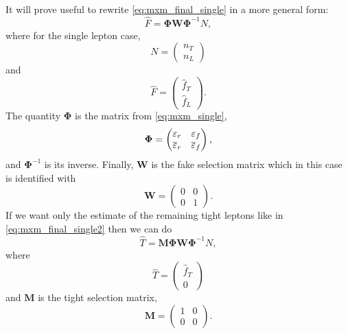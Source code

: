It will prove useful to rewrite \eqn\eqref{eq:mxm_final_single}
in a more general form:
\begin{equation}
\label{eq:mxm_general}
\hat{F} = \mathbf{\Phi}\mathbf{W}\mathbf{\Phi}^{-1} N,
\end{equation}
where for the single lepton case,
\begin{equation}
N=\begin{pmatrix} n_T \\ n_L\end{pmatrix}
\end{equation}
and 
\begin{equation}
\hat{F}=\begin{pmatrix} \hat{f}_T \\ \hat{f}_L\end{pmatrix}.
\end{equation}
The quantity $\mathbf{\Phi}$ is the matrix from \eqn\eqref{eq:mxm_single},
\begin{equation}
\mathbf{\Phi} = 
  \begin{pmatrix}
  \varepsilon_r& \varepsilon_f\\ \overline{\varepsilon}_r& \overline{\varepsilon}_f
  \end{pmatrix} ,
\end{equation}
and $\mathbf{\Phi}^{-1}$ is its inverse. Finally, $\mathbf{W}$
is the fake selection matrix which in this case is identified with
\begin{equation}
\mathbf{W}=\begin{pmatrix} 0 & 0 \\ 0 & 1 \end{pmatrix}.
\end{equation}
If we want only the estimate of the remaining tight leptons
like in \eqn\eqref{eq:mxm_final_single2}
then we can do 
\begin{equation}
\label{eq:mxm_general_tight}
\hat{T} = \mathbf{M}\mathbf{\Phi}\mathbf{W}\mathbf{\Phi}^{-1} N,
\end{equation}
where 
\begin{equation}
\hat{T}=\begin{pmatrix} \hat{f}_T \\ 0 \end{pmatrix}
\end{equation}
and $\mathbf{M}$ is the tight selection matrix,
\begin{equation}
\mathbf{M}=\begin{pmatrix} 1 & 0 \\ 0 & 0 \end{pmatrix}.
\end{equation}




